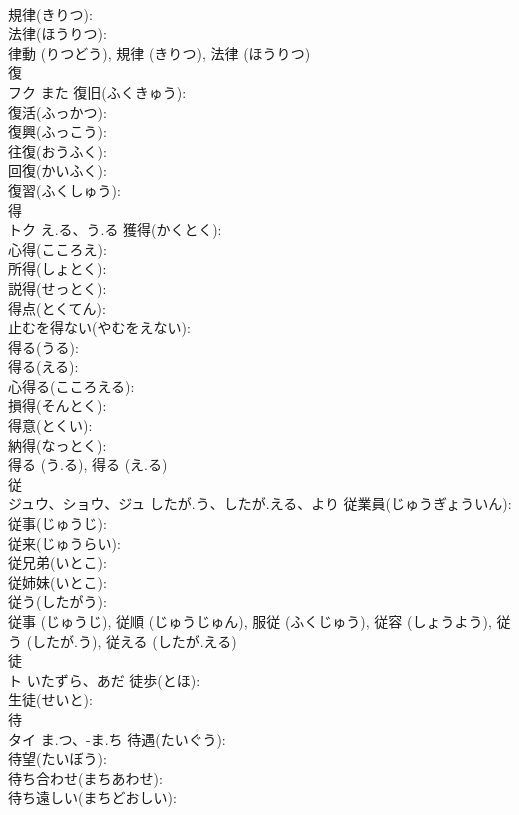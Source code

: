 \documentclass[8pt]{extreport}
\begin{document}
\begin{CJK}{UTF8}{min}
\\	規律(きりつ): 
\\	法律(ほうりつ): 
\\	律動 (りつどう), 規律 (きりつ), 法律 (ほうりつ)
\\	復			
\\	フク	また	復旧(ふくきゅう): 
\\	復活(ふっかつ): 
\\	復興(ふっこう): 
\\	往復(おうふく): 
\\	回復(かいふく): 
\\	復習(ふくしゅう): 
\\	得			
\\	トク	え.る、う.る	獲得(かくとく): 
\\	心得(こころえ): 
\\	所得(しょとく): 
\\	説得(せっとく): 
\\	得点(とくてん): 
\\	止むを得ない(やむをえない): 
\\	得る(うる): 
\\	得る(える): 
\\	心得る(こころえる): 
\\	損得(そんとく): 
\\	得意(とくい): 
\\	納得(なっとく): 
\\	得る (う.る), 得る (え.る)
\\	従			
\\	ジュウ、ショウ、ジュ	したが.う、したが.える、より	従業員(じゅうぎょういん): 
\\	従事(じゅうじ): 
\\	従来(じゅうらい): 
\\	従兄弟(いとこ): 
\\	従姉妹(いとこ): 
\\	従う(したがう): 
\\	従事 (じゅうじ), 従順 (じゅうじゅん), 服従 (ふくじゅう), 従容 (しょうよう), 従う (したが.う), 従える (したが.える)
\\	徒			
\\	ト	いたずら、あだ	徒歩(とほ): 
\\	生徒(せいと): 
\\	待			
\\	タイ	ま.つ、-ま.ち	待遇(たいぐう): 
\\	待望(たいぼう): 
\\	待ち合わせ(まちあわせ): 
\\	待ち遠しい(まちどおしい): 

\end{CJK}
\end{document}
